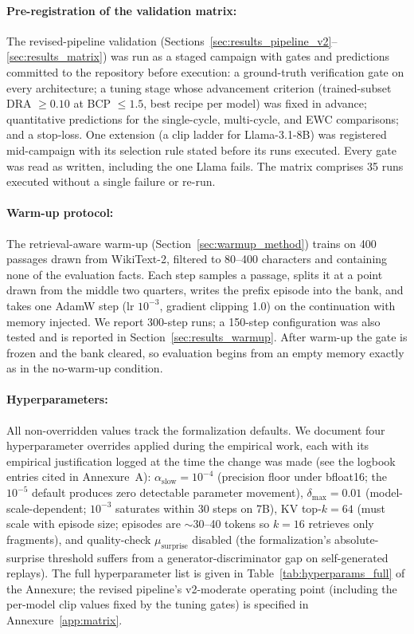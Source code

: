 \paragraph{Pre-registration of the validation matrix:}
The revised-pipeline validation (Sections~\ref{sec:results_pipeline_v2}--\ref{sec:results_matrix}) was run as a staged campaign with gates and predictions committed to the repository before execution: a ground-truth verification gate on every architecture; a tuning stage whose advancement criterion (trained-subset DRA $\geq 0.10$ at BCP $\leq 1.5$, best recipe per model) was fixed in advance; quantitative predictions for the single-cycle, multi-cycle, and EWC comparisons; and a stop-loss. One extension (a clip ladder for Llama-3.1-8B) was registered mid-campaign with its selection rule stated before its runs executed. Every gate was read as written, including the one Llama fails. The matrix comprises 35 runs executed without a single failure or re-run.

\paragraph{Warm-up protocol:}
The retrieval-aware warm-up (Section~\ref{sec:warmup_method}) trains on 400 passages drawn from WikiText-2, filtered to 80--400 characters and containing none of the evaluation facts. Each step samples a passage, splits it at a point drawn from the middle two quarters, writes the prefix episode into the bank, and takes one AdamW step (lr $10^{-3}$, gradient clipping 1.0) on the continuation with memory injected. We report 300-step runs; a 150-step configuration was also tested and is reported in Section~\ref{sec:results_warmup}. After warm-up the gate is frozen and the bank cleared, so evaluation begins from an empty memory exactly as in the no-warm-up condition.

\paragraph{Hyperparameters:}
All non-overridden values track the formalization defaults. We document four hyperparameter overrides applied during the empirical work, each with its empirical justification logged at the time the change was made (see the logbook entries cited in Annexure~A): $\alpha_{\mathrm{slow}} = 10^{-4}$ (precision floor under bfloat16; the $10^{-5}$ default produces zero detectable parameter movement), $\delta_{\max} = 0.01$ (model-scale-dependent; $10^{-3}$ saturates within 30 steps on 7B), KV top-$k = 64$ (must scale with episode size; episodes are $\sim 30$--40 tokens so $k=16$ retrieves only fragments), and quality-check $\mu_{\mathrm{surprise}}$ disabled (the formalization's absolute-surprise threshold suffers from a generator-discriminator gap on self-generated replays). The full hyperparameter list is given in Table~\ref{tab:hyperparams_full} of the Annexure; the revised pipeline's v2-moderate operating point (including the per-model clip values fixed by the tuning gates) is specified in Annexure~\ref{app:matrix}.

